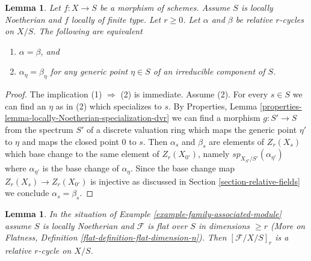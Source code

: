 \documentclass{stacks-project}
\theoremstyle{plain}
\newtheorem{lemma}[subsection]{Lemma}
\theoremstyle{definition}
\theoremstyle{remark}
\numberwithin{equation}{subsection}
\begin{document}
\begin{lemma}
\label{lemma-uniqueness-extension}
Let $f : X \to S$ be a morphism of schemes. Assume $S$ is locally Noetherian
and $f$ locally of finite type. Let $r \geq 0$. Let $\alpha$ and $\beta$
be relative $r$-cycles on $X/S$. The following are equivalent
\begin{enumerate}
\item $\alpha = \beta$, and
\item $\alpha_\eta = \beta_\eta$ for any generic point $\eta \in S$
of an irreducible component of $S$.
\end{enumerate}
\end{lemma}

\begin{proof}
The implication (1) $\Rightarrow$ (2) is immediate.
Assume (2). For every $s \in S$ we can find an $\eta$ as in (2)
which specializes to $s$. By
Properties, Lemma \ref{properties-lemma-locally-Noetherian-specialization-dvr}
we can find a morphism $g : S' \to S$ from the
spectrum $S'$ of a discrete valuation ring which maps
the generic point $\eta'$ to $\eta$ and maps
the closed point $0$ to $s$. Then $\alpha_s$ and $\beta_s$
are elements of $Z_r(X_s)$ which base change to the same
element of $Z_r(X_{0'})$, namely $sp_{X_{S'}/S'}(\alpha_{\eta'})$
where $\alpha_{\eta'}$ is the base change of $\alpha_\eta$.
Since the base change map $Z_r(X_s) \to Z_r(X_{0'})$ is injective
as discussed in Section \ref{section-relative-fields}
we conclude $\alpha_s = \beta_s$.
\end{proof}

\begin{lemma}
\label{lemma-family-associated-module-specialization}
In the situation of Example \ref{example-family-associated-module}
assume $S$ is locally Noetherian and
$\mathcal{F}$ is flat over $S$ in dimensions $\geq r$
(More on Flatness, Definition \ref{flat-definition-flat-dimension-n}).
Then $[\mathcal{F}/X/S]_r$ is a relative $r$-cycle on $X/S$.
\end{lemma}
\end{document}
